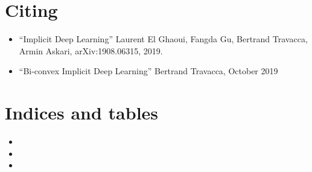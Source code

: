 \documentclass[letterpaper,10pt,english]{sphinxmanual}
\begin{document}
\section{}
\label{\detokenize{sections/classification_operational_example:regression-boston-housing}}

\chapter{Citing}
\label{\detokenize{sections/citing:citing}}\label{\detokenize{sections/citing:id1}}\label{\detokenize{sections/citing::doc}}\begin{itemize}
\item {} 
“Implicit Deep Learning” Laurent El Ghaoui, Fangda Gu, Bertrand Travacca, Armin Askari, arXiv:1908.06315, 2019.

\item {} 
“Bi-convex Implicit Deep Learning” Bertrand Travacca, October 2019

\end{itemize}


\chapter{Indices and tables}
\label{\detokenize{index:indices-and-tables}}\begin{itemize}
\item {} 

\item {} 

\item {} 

\end{itemize}


\renewcommand{\indexname}{Python Module Index}
\begin{sphinxtheindex}
\let\bigletter\sphinxstyleindexlettergroup
\bigletter{u}
\item\relax{}
\item\relax{}
\end{sphinxtheindex}

\renewcommand{\indexname}{Index}
\printindex
\end{document}
